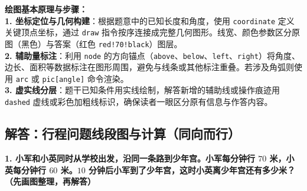 \vspace{0.6cm}

{\small\color{blue!70!black}
\textbf{绘图基本原理与步骤：}\\
\textbf{1. 坐标定位与几何构建}：根据题意中的已知长度和角度，使用 \texttt{coordinate} 定义关键顶点坐标，通过 \texttt{draw} 指令按序连接成完整几何图形。线宽、颜色参数区分原图（黑色）与答案（红色 \texttt{red!70!black}）图层。\\
\textbf{2. 辅助量标注}：利用 \texttt{node} 的方向锚点（\texttt{above}、\texttt{below}、\texttt{left}、\texttt{right}）将角度、边长、面积等数据标注在图形周围，避免与线条或其他标注重叠。若涉及角弧则使用 \texttt{arc} 或 \texttt{pic[angle]} 命令渲染。\\
\textbf{3. 虚实线分层}：题干已知条件用实线绘制，解答新增的辅助线或操作痕迹用 \texttt{dashed} 虚线或彩色加粗线标识，确保读者一眼区分原有信息与作答内容。
}



\newpage

\subsection{解答：行程问题线段图与计算（同向而行）}

\vspace{0.4cm}

\noindent\textbf{1. 小军和小英同时从学校出发，沿同一条路到少年宫。小军每分钟行 $70$ 米，小英每分钟行 $60$ 米。$10$ 分钟后小军到了少年宫，这时小英离少年宫还有多少米？（先画图整理，再解答）}

\vspace{0.8cm}


